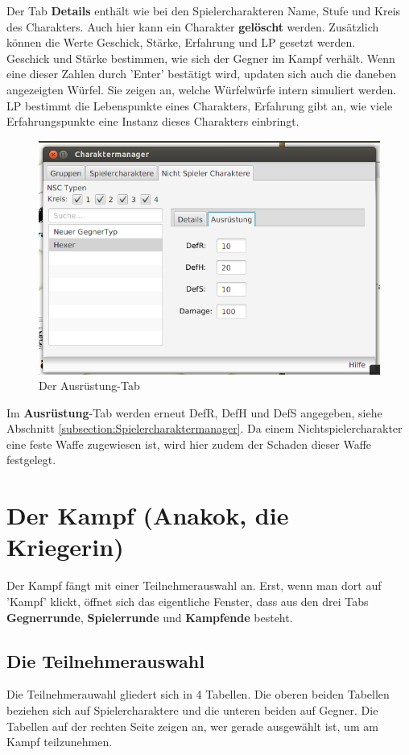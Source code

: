 \documentclass[11pt, a4paper, german]{article}
\begin{document}
Der Tab \textbf{Details} enthält wie bei den Spielercharakteren Name, Stufe und Kreis des Charakters. Auch hier kann ein Charakter \textbf{gelöscht} werden. 
Zusätzlich können die Werte Geschick, Stärke, Erfahrung und LP gesetzt werden.\\
 Geschick und Stärke bestimmen, wie sich der Gegner im Kampf verhält. Wenn eine dieser Zahlen durch 'Enter' bestätigt wird, updaten sich auch die daneben angezeigten Würfel. 
Sie zeigen an, welche Würfelwürfe intern simuliert werden. LP bestimmt die Lebenspunkte eines Charakters, Erfahrung gibt an, wie viele Erfahrungspunkte eine Instanz dieses Charakters einbringt.\\
\begin{figure}
\centering
\includegraphics[width=1\linewidth]{Bilder/Nichtspielertypmanager2}
\caption{Der Ausrüstung-Tab}
\label{fig:Nichtspielertypmanager2}
\end{figure}

Im \textbf{Ausrüstung}-Tab werden erneut DefR, DefH und DefS angegeben, siehe Abschnitt \ref{subsection:Spielercharaktermanager}. 
Da einem Nichtspielercharakter eine feste Waffe zugewiesen ist, wird hier zudem der Schaden dieser Waffe festgelegt.

\clearpage
\section{Der Kampf (Anakok, die Kriegerin)}\label{Abschnitt:Kampf}
Der Kampf fängt mit einer Teilnehmerauswahl an. Erst, wenn man dort auf 'Kampf' klickt, öffnet sich das eigentliche Fenster, dass aus den drei Tabs \textbf{Gegnerrunde}, \textbf{Spielerrunde} und \textbf{Kampfende} besteht.
\subsection{Die Teilnehmerauswahl}
Die Teilnehmerauwahl gliedert sich in 4 Tabellen. Die oberen beiden Tabellen beziehen sich auf Spielercharaktere und die unteren beiden auf Gegner. Die Tabellen auf der rechten Seite zeigen an, wer gerade ausgewählt ist, um am Kampf teilzunehmen.\\
\end{document}
